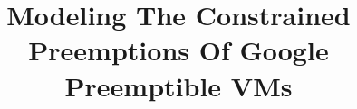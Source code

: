 \documentclass[sigconf, review, anonymous]{acmart} %
\begin{document}
\title{Modeling The Constrained Preemptions Of Google Preemptible VMs}
\author{}{}{}

\begin{abstract}
  
\end{abstract}

\maketitle





%





%

%












{


%
}
\end{document}
